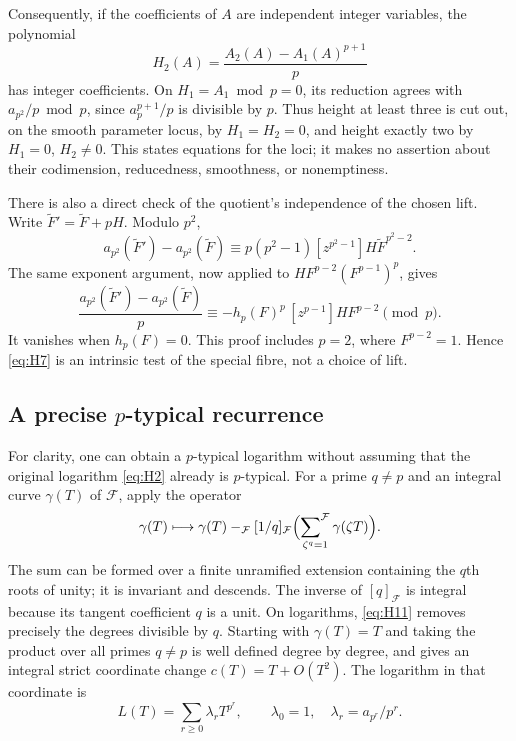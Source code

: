 Consequently, if the coefficients of $A$ are independent integer
variables, the polynomial
\begin{equation}
 H_2(A)=\frac{A_2(A)-A_1(A)^{p+1}}p                \label{eq:H9}
\end{equation}
has integer coefficients. On $H_1=A_1\bmod p=0$, its reduction agrees
with $a_{p^2}/p\bmod p$, since $a_p^{p+1}/p$ is divisible by $p$.
Thus height at least three is cut out, on the smooth parameter locus,
by $H_1=H_2=0$, and height exactly two by $H_1=0$, $H_2\ne0$.
This states equations for the loci; it makes no assertion about their
codimension, reducedness, smoothness, or nonemptiness.

There is also a direct check of the quotient's independence of the
chosen lift. Write $\widetilde F'=\widetilde F+pH$. Modulo $p^2$,
\[
 a_{p^2}(\widetilde F')-a_{p^2}(\widetilde F)
 \equiv p(p^2-1)[z^{p^2-1}]H\widetilde F^{p^2-2}.
\]
The same exponent argument, now applied to
$HF^{p-2}(F^{p-1})^p$, gives
\begin{equation}
 \frac{a_{p^2}(\widetilde F')-a_{p^2}(\widetilde F)}p
 \equiv
 -h_p(F)^p\,[z^{p-1}]HF^{p-2}\pmod p.             \label{eq:H10}
\end{equation}
It vanishes when $h_p(F)=0$. This proof includes $p=2$, where
$F^{p-2}=1$. Hence \eqref{eq:H7} is an intrinsic test of the special fibre,
not a choice of lift.

\subsection{A precise $p$-typical recurrence}
For clarity, one can obtain a $p$-typical logarithm without assuming
that the original logarithm \eqref{eq:H2} already is $p$-typical.
For a prime $q\ne p$ and an integral curve $\gamma(T)$ of $\mathcal F$,
apply the operator
\begin{equation}
 \gamma(T)\longmapsto
 \gamma(T)-_{\mathcal F}[1/q]_{\mathcal F}
       \Bigl(\mathop{\sum\nolimits^{\mathcal F}}_{\zeta^q=1}
                         \gamma(\zeta T)\Bigr).    \label{eq:H11}
\end{equation}
The sum can be formed over a finite unramified extension containing
the $q$th roots of unity; it is invariant and descends.
The inverse of $[q]_{\mathcal F}$ is integral because its tangent
coefficient $q$ is a unit. On logarithms, \eqref{eq:H11} removes precisely
the degrees divisible by $q$. Starting with $\gamma(T)=T$ and taking
the product over all primes $q\ne p$ is well defined degree by degree,
and gives an integral strict coordinate change $c(T)=T+O(T^2)$.
The logarithm in that coordinate is
\begin{equation}
 L(T)=\sum_{r\ge0}\lambda_rT^{p^r},\qquad
 \lambda_0=1,\quad \lambda_r=a_{p^r}/p^r.          \label{eq:H12}
\end{equation}

